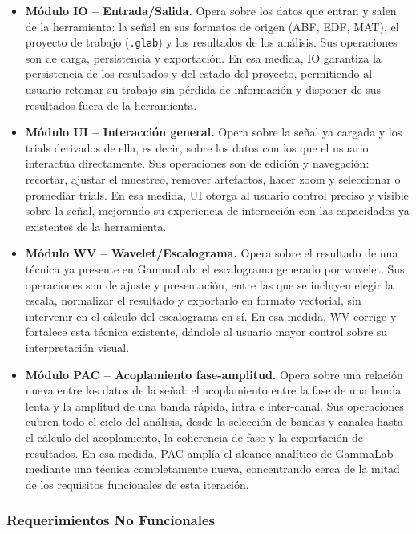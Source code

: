 \documentclass[12pt,letterpaper,oneside]{article}
\begin{document}
\begin{itemize}
    \item \textbf{Módulo IO -- Entrada/Salida.} Opera sobre los datos que entran y salen de la herramienta: la señal en sus formatos de origen (ABF, EDF, MAT), el proyecto de trabajo (\texttt{.glab}) y los resultados de los análisis. Sus operaciones son de carga, persistencia y exportación. En esa medida, IO garantiza la persistencia de los resultados y del estado del proyecto, permitiendo al usuario retomar su trabajo sin pérdida de información y disponer de sus resultados fuera de la herramienta.

    \item \textbf{Módulo UI -- Interacción general.} Opera sobre la señal ya cargada y los trials derivados de ella, es decir, sobre los datos con los que el usuario interactúa directamente. Sus operaciones son de edición y navegación: recortar, ajustar el muestreo, remover artefactos, hacer zoom y seleccionar o promediar trials. En esa medida, UI otorga al usuario control preciso y visible sobre la señal, mejorando su experiencia de interacción con las capacidades ya existentes de la herramienta.

    \item \textbf{Módulo WV -- Wavelet/Escalograma.} Opera sobre el resultado de una técnica ya presente en GammaLab: el escalograma generado por wavelet. Sus operaciones son de ajuste y presentación, entre las que se incluyen elegir la escala, normalizar el resultado y exportarlo en formato vectorial, sin intervenir en el cálculo del escalograma en sí. En esa medida, WV corrige y fortalece esta técnica existente, dándole al usuario mayor control sobre su interpretación visual.

    \item \textbf{Módulo PAC -- Acoplamiento fase-amplitud.} Opera sobre una relación nueva entre los datos de la señal: el acoplamiento entre la fase de una banda lenta y la amplitud de una banda rápida, intra e inter-canal. Sus operaciones cubren todo el ciclo del análisis, desde la selección de bandas y canales hasta el cálculo del acoplamiento, la coherencia de fase y la exportación de resultados. En esa medida, PAC amplía el alcance analítico de GammaLab mediante una técnica completamente nueva, concentrando cerca de la mitad de los requisitos funcionales de esta iteración.
\end{itemize}

\subsubsection{Requerimientos No Funcionales}
\end{document}
